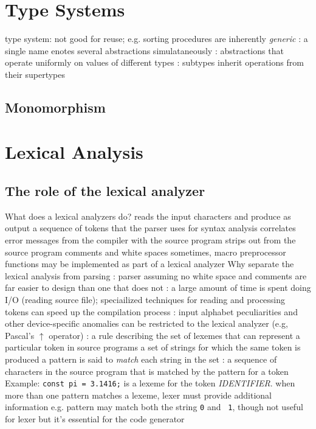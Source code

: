 \documentclass{myart}
\begin{document}
\section{Type Systems}
\bit
\w {} type system:
	not good for reuse; e.g. sorting procedures are inherently
	{\em generic}
\w {}: a single name enotes several abstractions
	simulataneously
\w {}: abstractions that operate uniformly on
	values of different types
\w {}: subtypes inherit operations from their supertypes
\eit

\subsection{Monomorphism}
\bit
\w 
\eit















\section{Lexical Analysis}
\subsection{The role of the lexical analyzer}
\bit
\w What does a lexical analyzers do?
	\bit
	\w reads the input characters and produce as output a sequence
of tokens that the parser uses for syntax analysis
	\w correlates error messages from the compiler with the source
program
	\w strips out from the source program comments and white
spaces
	\w sometimes, macro preprocessor functions may be implemented
as part of a lexical analyzer
	\eit
\w Why separate the lexical analysis from parsing
	\bit
	\w {}: parser assuming no white space and
comments are far easier to design than one that does not
	\w {}:  a large amount of time is spent
doing I/O (reading source file); speciailized techniques for reading
and processing tokens can speed up the compilation process
	\w {}: 
	input alphabet peculiarities and other device-specific
anomalies can be restricted to the lexical analyzer (e.g, Pascal's
$\uparrow$ operator)
	\eit
\w {}
	\bit
	\w {}: a rule describing the set of lexemes that can
represent a particular token in source programs
		 a set of strings for which the same token
		is produced
	\w a pattern is said to {\em match\/} each string in the set
	\w {}: a sequence of characters in the source program
that is matched by the pattern for a token
	\w Example: {\tt const pi = 3.1416;} 
		\bit
		 is a lexeme for the token {\em IDENTIFIER\/}.
		\eit
	\eit
\w {}
	\bit
	\w when more than one pattern matches a lexeme, lexer must
provide additional information
	e.g. pattern  may match both the string {\tt 0} and {\tt
1},
	though not useful for lexer but it's essential for the code generator 
	\eit
\eit
\end{document}
